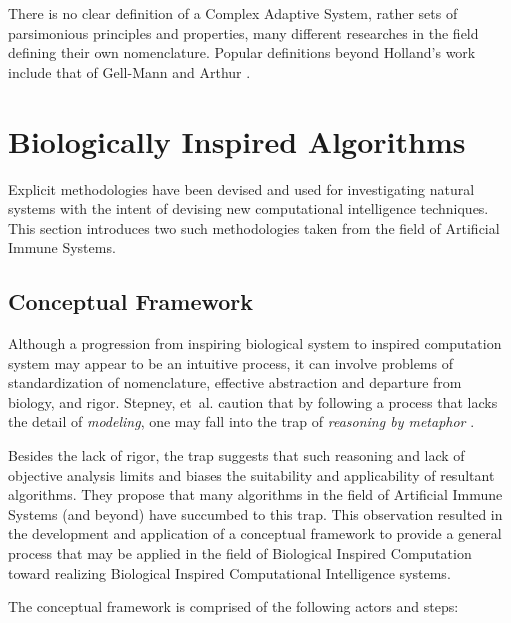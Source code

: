 \documentclass[a4paper, 11pt]{article}
\begin{document}
There is no clear definition of a Complex Adaptive System, rather sets of parsimonious principles and properties, many different researches in the field defining their own nomenclature. Popular definitions beyond Holland's work include that of Gell-Mann \cite{Gell-Mann1994} and Arthur \cite{Arthur1997}.



% 
% 
\section{Biologically Inspired Algorithms}
\label{sub:bia}
Explicit methodologies have been devised and used for investigating natural systems with the intent of devising new computational intelligence techniques. This section introduces two such methodologies taken from the field of Artificial Immune Systems.


% 
% 
\subsection{Conceptual Framework}
Although a progression from inspiring biological system to inspired computation system may appear to be an intuitive process, it can involve problems of standardization of nomenclature, effective abstraction and departure from biology, and rigor. Stepney, et~al. caution that by following a process that lacks the detail of \emph{modeling}, one may fall into the trap of \emph{reasoning by metaphor} \cite{Twycross2005, Stepney2004, Stepney2005}. 

Besides the lack of rigor, the trap suggests that such reasoning and lack of objective analysis limits and biases the suitability and applicability of resultant algorithms. They propose that many algorithms in the field of Artificial Immune Systems (and beyond) have succumbed to this trap. This observation resulted in the development and application of a conceptual framework to provide a general process that may be applied in the field of Biological Inspired Computation toward realizing Biological Inspired Computational Intelligence systems. 

The conceptual framework is comprised of the following actors and steps:
\end{document}
